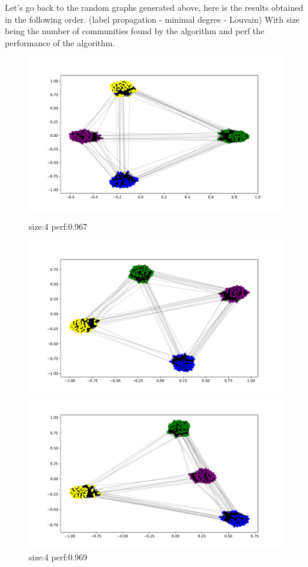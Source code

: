 \documentclass{article}
\begin{document}
Let's go back to the random graphs generated above, here is the results
obtained in the following order. (label propagation - minimal degree - Louvain)
With size being the number of communities found by the algorithm and perf
the performance of the algorithm.

\begin{figure}[!ht]
\centering
\begin{minipage}{.33\textwidth}
  \centering
  \includegraphics[width=\linewidth]{plots/images1/LabelPropagation.pdf}
  \caption*{size:4 perf:0.967}
\end{minipage}%
\begin{minipage}{.33\textwidth}
  \centering
  \includegraphics[width=\linewidth]{plots/images1/ex3minimalDegree.pdf}
  \caption*{size:4 perf:0.969}
\end{minipage}
\begin{minipage}{.33\textwidth}
  \centering
  \includegraphics[width=\linewidth]{plots/images1/Louvain.pdf}

\end{minipage}
\end{figure}
\end{document}
